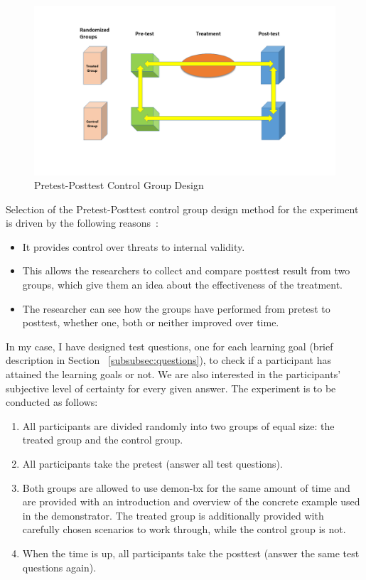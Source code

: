 \begin{figure}
	\includegraphics[width=1\textwidth]{figures/PrePost_Test}
	\caption{Pretest-Posttest Control Group Design }
	\label{fig:PrePost_Test}
\end{figure}

Selection of the Pretest-Posttest control group design method for the experiment is driven by the following reasons~\cite{anovapreposttest}:
\begin{itemize}
	\item It provides control over threats to internal validity.
	\item This allows the researchers to collect and compare posttest result from two groups, which give them an idea about the effectiveness of the treatment.
	\item The researcher can see how the groups have performed from pretest to posttest, whether one, both or neither improved over time.
\end{itemize}

In my case, I have designed test questions, one for each learning goal (brief description in Section~ \ref{subsubsec:questions}), to check if a participant has attained the learning goals or not.
We are also interested in the participants' subjective level of certainty for every given answer. 
The experiment is to be conducted as follows:

\begin{enumerate}
	\item All participants are divided randomly into two groups of equal size: the treated group and the control group.
	\item All participants take the pretest (answer all test questions).
	\item Both groups are allowed to use demon-bx for the same amount of time and are provided with an introduction and overview of the concrete example used in the demonstrator.
	The treated group is additionally provided with carefully chosen scenarios to work through, while the control group is not.
	\item When the time is up, all participants take the posttest (answer the same test questions again).
\end{enumerate}

